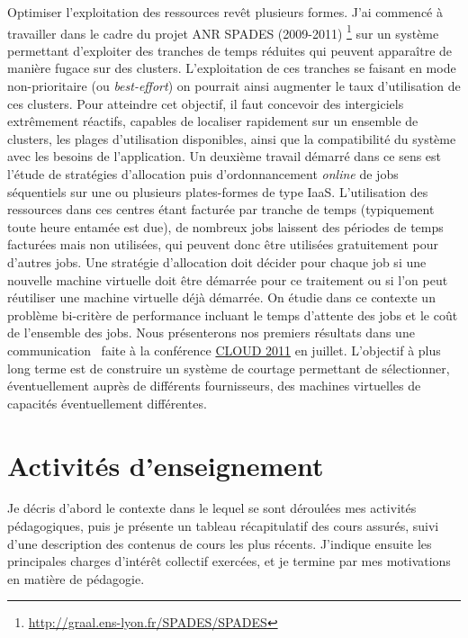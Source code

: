 \documentclass[11pt]{article}
\begin{document}
Optimiser l'exploitation des ressources revêt plusieurs formes. J'ai commencé à
travailler dans le cadre du projet ANR SPADES (2009-2011)%
\footnote{\url{http://graal.ens-lyon.fr/SPADES/SPADES}}  
sur un système permettant d'exploiter des tranches de temps réduites qui peuvent 
apparaître de manière fugace sur des clusters. L'exploitation de ces tranches se
faisant en mode non-prioritaire (ou \textit{best-effort}) on pourrait ainsi 
augmenter le taux d'utilisation de ces clusters. Pour atteindre cet objectif, il 
faut concevoir des intergiciels extrêmement réactifs, capables de localiser 
rapidement sur un ensemble de clusters, les plages d'utilisation disponibles, 
ainsi que la compatibilité du système avec les besoins de l'application. 
Un deuxième travail démarré dans ce sens est l'étude de stratégies d'allocation
puis d'ordonnancement \textit{online} de jobs séquentiels sur une ou plusieurs 
plates-formes de type IaaS. L'utilisation des ressources dans ces centres étant 
facturée par tranche de temps (typiquement toute heure entamée est due), de 
nombreux jobs laissent des périodes de temps facturées mais non utilisées, qui 
peuvent donc être utilisées gratuitement pour d'autres jobs. Une stratégie 
d'allocation doit décider pour chaque job si une nouvelle machine virtuelle doit 
être démarrée pour ce traitement ou si l'on peut réutiliser une machine virtuelle 
déjà démarrée. On étudie dans ce contexte un problème bi-critère de performance 
incluant le temps d'attente des jobs et le coût de l'ensemble des jobs. 
Nous présenterons nos premiers résultats dans une communication~\cite{icps-2011-225} 
faite à la conférence \href{http://www.thecloudcomputing.org/2011/}{CLOUD 2011} en juillet.
L'objectif à plus long terme est de construire un système de courtage permettant 
de sélectionner, éventuellement auprès de différents fournisseurs, des machines 
virtuelles de capacités éventuellement différentes.






\newpage

\section{Activités d'enseignement}
\label{sc:ensgnt-univ}

Je décris d'abord le contexte dans le lequel se sont déroulées mes activités
pédagogiques, puis je présente un tableau récapitulatif des cours assurés, suivi
d'une description des contenus de cours les plus récents. J'indique ensuite les
principales charges d'intérêt collectif exercées, et je termine par mes motivations
en matière de pédagogie.
\end{document}
